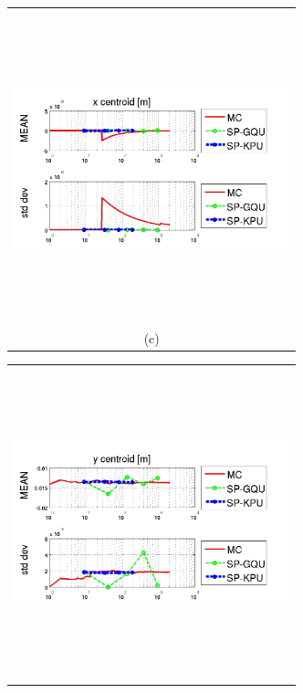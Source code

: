 \documentclass{article}
\newcommand{\Pic}[2][0.85]{\begin{center}\texttt{[image: \#2]}
 \end{center} }
\begin{document}
\begin{figure}[H]
\begin{minipage}[b]{0.6\textwidth}
\begin{tabular}{c}
        \end{tabular}
    \end{minipage}
    \begin{minipage}{0.6\textwidth}
        \begin{tabular}{c}
	\includegraphics[width=8cm,height=9cm,keepaspectratio]{fig/pics4rv/trei4rv.jpg}\\
        (c)
        \end{tabular}
    \end{minipage}
   \begin{minipage}[c]{0.6\textwidth}
       \begin{tabular}{c}
       \includegraphics[width=8cm,height=9cm,keepaspectratio]{fig/pics4rv/patru4rv.jpg}\\

\end{tabular}
\end{minipage}
\end{figure}
\end{document}
